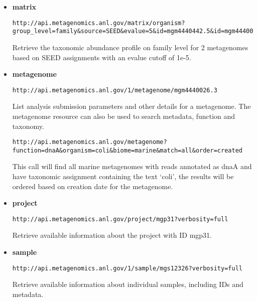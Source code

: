 \begin{itemize}
\item
\textbf{matrix}
\begin{small}
\begin{lstlisting}
http://api.metagenomics.anl.gov/matrix/organism?group_level=family&source=SEED&evalue=5&id=mgm4440442.5&id=mgm4440026.3
\end{lstlisting}
\end{small}
Retrieve the taxonomic abundance profile on family level for 2 metagenomes based on SEED assignments with an evalue cutoff of 1e-5.

\item
\textbf{metagenome}
\begin{small}
\begin{lstlisting}
http://api.metagenomics.anl.gov/1/metagenome/mgm4440026.3
\end{lstlisting}
\end{small} List analysis submission parameters and other details for a metagenome.
\newline
The metagenome resource can also be used to search metadata, function and taxonomy.  
\begin{small}
\begin{lstlisting}
http://api.metagenomics.anl.gov/metagenome?function=dnaA&organism=coli&biome=marine&match=all&order=created
\end{lstlisting}
\end{small} This call will find all marine metagenomes with reads annotated as dnaA and have taxonomic assignment containing the text `coli', the results will be ordered based on creation date for the metagenome.

\item
\textbf{project}
\begin{small}
\begin{lstlisting}
http://api.metagenomics.anl.gov/project/mgp31?verbosity=full
\end{lstlisting}
\end{small} Retrieve available information about the project with ID mgp31.

\item
\textbf{sample}
\begin{small}
\begin{lstlisting}
http://api.metagenomics.anl.gov/1/sample/mgs12326?verbosity=full
\end{lstlisting}
\end{small} Retrieve available information about individual samples, including IDs and metadata.


\end{itemize}

